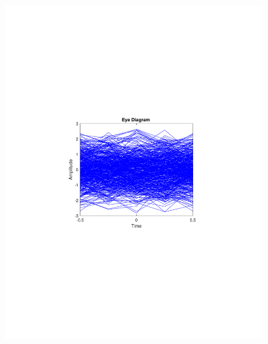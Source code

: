 \begin{refsection}
\begin{figure}[H]
\begin{minipage}{0.30\textwidth}
		\includegraphics[clip, trim=4cm 8cm 4cm 8cm, width=1\textwidth]{./sdf/m_qam_system/figures/expResults/homodyne/1_eye_16GBdInSig13dB_AfFec.pdf}
		\label{fig:16GBdSpecAftFec}
	\end{minipage}
	\begin{minipage}{0.30\textwidth}
		\centering

\end{minipage}
\end{figure}
\end{refsection}
